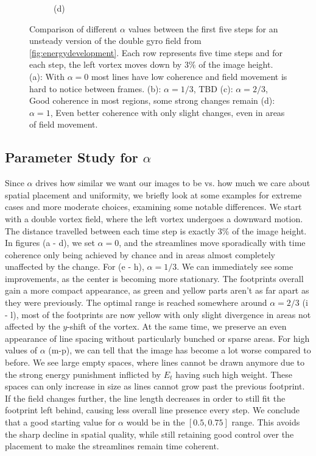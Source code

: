 \begin{figure}[ht]
\begin{subfigure}{\textwidth}
\begin{subfigure}{.19\textwidth}
        \end{subfigure}
        \caption*{(d)}
    \end{subfigure}
    \caption{
        Comparison of different $\alpha$ values between the first five steps for an unsteady version of the double gyro field from \cref{fig:energydevelopment}.
        Each row represents five time steps and for each step, the left vortex moves down by $3\%$ of the image height.
        (a): With $\alpha=0$ most lines have low coherence and field movement is hard to notice between frames.
        (b): $\alpha=1/3$, TBD
        (c): $\alpha=2/3$, Good coherence in most regions, some strong changes remain
        (d): $\alpha=1$, Even better coherence with only slight changes, even in areas of field movement.
    }
\end{figure}

\subsection{Parameter Study for $\alpha$}
Since $\alpha$ drives how similar we want our images to be vs. how much we care about spatial placement and uniformity,
we briefly look at some examples for extreme cases and more moderate choices, examining some notable differences.
We start with a double vortex field, where the left vortex undergoes a downward motion. The distance travelled between each time step
is exactly 3\% of the image height.\\
In figures (a - d), we set $\alpha=0$, and the streamlines move sporadically with time coherence only being achieved by chance
and in areas almost completely unaffected by the change.
For (e - h), $\alpha=1/3$. We can immediately see some improvements, as the center is becoming more stationary.
The footprints overall gain a more compact appearance, as green and yellow parts aren't as far apart as they were previously.
The optimal range is reached somewhere around $\alpha=2/3$ (i - l), 
most of the footprints are now yellow with only slight divergence in areas not affected by the $y$-shift of the vortex.
At the same time, we preserve an even appearance of line spacing without particularly bunched or sparse areas.
For high values of $\alpha$ (m-p), we can tell that the image has become a lot worse compared to before.
We see large empty spaces, where lines cannot be drawn anymore due to the strong energy punishment inflicted by $E_t$ having such high weight.
These spaces can only increase in size as lines cannot grow past the previous footprint.
If the field changes further, the line length decreases in order to still fit the footprint left behind, causing less overall line presence every step.
We conclude that a good starting value for $\alpha$ would be in the $[0.5, 0.75]$ range.
This avoids the sharp decline in spatial quality, while still retaining good control over the placement to make the streamlines remain time coherent.

